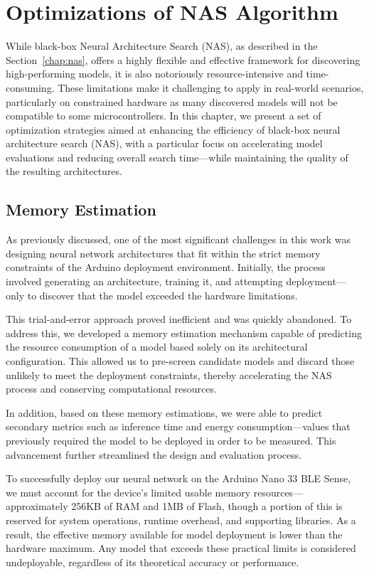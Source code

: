 \chapter{Optimizations of NAS Algorithm}
\label{chap:nas_optimizations}

\begin{sloppypar}
While black-box Neural Architecture Search (NAS), as described in the Section~\ref{chap:nas}, offers a highly flexible and effective framework for discovering high-performing models, it is also notoriously resource-intensive and time-consuming. These limitations make it challenging to apply in real-world scenarios, particularly on constrained hardware as many discovered models will not be compatible to some microcontrollers. 
In this chapter, we present a set of optimization strategies aimed at enhancing the efficiency of black-box neural architecture search (NAS), with a particular focus on accelerating model evaluations and reducing overall search time—while maintaining the quality of the resulting architectures.
\end{sloppypar}

\section{Memory Estimation}

As previously discussed, one of the most significant challenges in this work was designing neural network architectures that fit within the strict memory constraints of the Arduino deployment environment. Initially, the process involved generating an architecture, training it, and attempting deployment—only to discover that the model exceeded the hardware limitations. 

This trial-and-error approach proved inefficient and was quickly abandoned. To address this, we developed a memory estimation mechanism capable of predicting the resource consumption of a model based solely on its architectural configuration. This allowed us to pre-screen candidate models and discard those unlikely to meet the deployment constraints, thereby accelerating the NAS process and conserving computational resources.

In addition, based on these memory estimations, we were able to predict secondary metrics such as inference time and energy consumption—values that previously required the model to be deployed in order to be measured. This advancement further streamlined the design and evaluation process.


To successfully deploy our neural network on the Arduino Nano 33 BLE Sense, we must account for the device’s limited usable memory resources—approximately 256KB of RAM and 1MB of Flash, though a portion of this is reserved for system operations, runtime overhead, and supporting libraries. As a result, the effective memory available for model deployment is lower than the hardware maximum. Any model that exceeds these practical limits is considered undeployable, regardless of its theoretical accuracy or performance.

